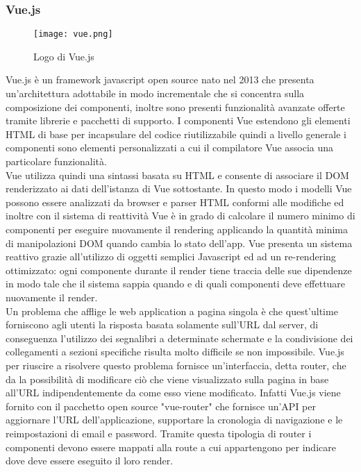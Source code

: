 \subsubsection*{Vue.js}
\begin{figure}[H]
	\begin{center}
		\texttt{[image: vue.png]}
		\caption{Logo di Vue.js}
	\end{center}
\end{figure}
Vue.js è un framework javascript open source nato nel 2013 che presenta un'architettura adottabile in modo incrementale che si concentra sulla composizione dei componenti, inoltre sono presenti funzionalità avanzate offerte tramite librerie e pacchetti di supporto. I componenti Vue estendono gli elementi HTML di base per incapsulare del codice riutilizzabile quindi a livello generale i componenti sono elementi personalizzati a cui il compilatore Vue associa una particolare funzionalità.\\
Vue utilizza quindi una sintassi basata su HTML e consente di associare il DOM renderizzato ai dati dell'istanza di Vue sottostante. In questo modo i modelli Vue possono essere analizzati da browser e parser HTML conformi alle modifiche ed inoltre con il sistema di reattività Vue è in grado di calcolare il numero minimo di componenti per eseguire nuovamente il rendering applicando la quantità minima di manipolazioni DOM quando cambia lo stato dell'app. Vue presenta un sistema reattivo grazie all'utilizzo di oggetti semplici Javascript ed ad un re-rendering ottimizzato: ogni componente durante il render tiene traccia delle sue dipendenze in modo tale che il sistema sappia quando e di quali componenti deve effettuare nuovamente il render.\\
Un problema che afflige le web application a pagina singola è che quest'ultime forniscono agli utenti la risposta basata solamente sull'URL dal server, di conseguenza l'utilizzo dei segnalibri a determinate schermate e la condivisione dei collegamenti a sezioni specifiche risulta molto difficile se non impossibile. Vue.js per riuscire a risolvere questo problema fornisce un'interfaccia, detta router, che da la possibilità di modificare ciò che viene visualizzato sulla pagina in base all'URL indipendentemente da come esso viene modificato. Infatti Vue.js viene fornito con il pacchetto open source "vue-router" che fornisce un'API per aggiornare l'URL dell'applicazione, supportare la cronologia di navigazione e le reimpostazioni di email e password. Tramite questa tipologia di router i componenti devono essere mappati alla route a cui appartengono per indicare dove deve essere eseguito il loro render.\\

